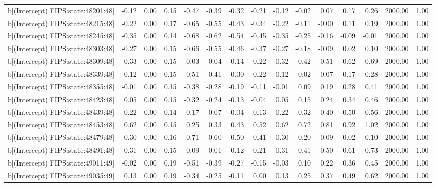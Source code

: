 \begin{table}[ht]
\begin{tabular}{rrrrrrrrrrrrrrr}
  b[(Intercept) FIPS:state:48201:48] & -0.12 & 0.00 & 0.15 & -0.47 & -0.39 & -0.32 & -0.21 & -0.12 & -0.02 & 0.07 & 0.17 & 0.26 & 2000.00 & 1.00 \\ 
  b[(Intercept) FIPS:state:48215:48] & -0.22 & 0.00 & 0.17 & -0.65 & -0.55 & -0.43 & -0.34 & -0.22 & -0.11 & -0.00 & 0.11 & 0.19 & 2000.00 & 1.00 \\ 
  b[(Intercept) FIPS:state:48245:48] & -0.35 & 0.00 & 0.14 & -0.68 & -0.62 & -0.54 & -0.45 & -0.35 & -0.25 & -0.16 & -0.09 & -0.01 & 2000.00 & 1.00 \\ 
  b[(Intercept) FIPS:state:48303:48] & -0.27 & 0.00 & 0.15 & -0.66 & -0.55 & -0.46 & -0.37 & -0.27 & -0.18 & -0.09 & 0.02 & 0.10 & 2000.00 & 1.00 \\ 
  b[(Intercept) FIPS:state:48309:48] & 0.33 & 0.00 & 0.15 & -0.03 & 0.04 & 0.14 & 0.22 & 0.32 & 0.42 & 0.51 & 0.62 & 0.69 & 2000.00 & 1.00 \\ 
  b[(Intercept) FIPS:state:48339:48] & -0.12 & 0.00 & 0.15 & -0.51 & -0.41 & -0.30 & -0.22 & -0.12 & -0.02 & 0.07 & 0.17 & 0.28 & 2000.00 & 1.00 \\ 
  b[(Intercept) FIPS:state:48355:48] & -0.01 & 0.00 & 0.15 & -0.38 & -0.28 & -0.19 & -0.11 & -0.01 & 0.09 & 0.19 & 0.28 & 0.41 & 2000.00 & 1.00 \\ 
  b[(Intercept) FIPS:state:48423:48] & 0.05 & 0.00 & 0.15 & -0.32 & -0.24 & -0.13 & -0.04 & 0.05 & 0.15 & 0.24 & 0.34 & 0.46 & 2000.00 & 1.00 \\ 
  b[(Intercept) FIPS:state:48439:48] & 0.22 & 0.00 & 0.14 & -0.17 & -0.07 & 0.04 & 0.13 & 0.22 & 0.32 & 0.40 & 0.50 & 0.56 & 2000.00 & 1.00 \\ 
  b[(Intercept) FIPS:state:48453:48] & 0.62 & 0.00 & 0.15 & 0.25 & 0.33 & 0.43 & 0.52 & 0.62 & 0.72 & 0.81 & 0.92 & 1.02 & 2000.00 & 1.00 \\ 
  b[(Intercept) FIPS:state:48479:48] & -0.30 & 0.00 & 0.16 & -0.71 & -0.60 & -0.50 & -0.41 & -0.30 & -0.20 & -0.09 & 0.02 & 0.10 & 2000.00 & 1.00 \\ 
  b[(Intercept) FIPS:state:48491:48] & 0.31 & 0.00 & 0.15 & -0.09 & 0.01 & 0.12 & 0.21 & 0.31 & 0.41 & 0.50 & 0.61 & 0.73 & 2000.00 & 1.00 \\ 
  b[(Intercept) FIPS:state:49011:49] & -0.02 & 0.00 & 0.19 & -0.51 & -0.39 & -0.27 & -0.15 & -0.03 & 0.10 & 0.22 & 0.36 & 0.45 & 2000.00 & 1.00 \\ 
  b[(Intercept) FIPS:state:49035:49] & 0.13 & 0.00 & 0.19 & -0.34 & -0.25 & -0.11 & 0.00 & 0.13 & 0.25 & 0.37 & 0.49 & 0.62 & 2000.00 & 1.00 \\ 

\end{tabular}
\end{table}
